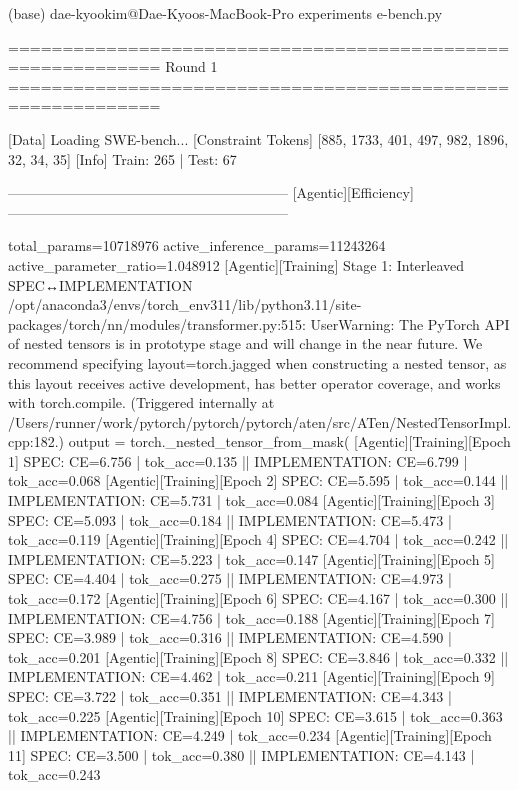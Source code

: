 (base) dae-kyookim@Dae-Kyoos-MacBook-Pro experiments %
e-bench.py

============================================================
Round 1
============================================================

[Data] Loading SWE-bench...
[Constraint Tokens] [885, 1733, 401, 497, 982, 1896, 32, 34, 35]
[Info] Train: 265 | Test: 67

------------------------------------------------------------
[Agentic][Efficiency]
------------------------------------------------------------

total_params=10718976
active_inference_params=11243264
active_parameter_ratio=1.048912
[Agentic][Training] Stage 1: Interleaved SPEC↔IMPLEMENTATION
/opt/anaconda3/envs/torch_env311/lib/python3.11/site-packages/torch/nn/modules/transformer.py:515: UserWarning: The PyTorch API of nested tensors is in prototype stage and will change in the near future. We recommend specifying layout=torch.jagged when constructing a nested tensor, as this layout receives active development, has better operator coverage, and works with torch.compile. (Triggered internally at /Users/runner/work/pytorch/pytorch/pytorch/aten/src/ATen/NestedTensorImpl.cpp:182.)
output = torch._nested_tensor_from_mask(
[Agentic][Training][Epoch 1] SPEC: CE=6.756 | tok_acc=0.135  ||  IMPLEMENTATION: CE=6.799 | tok_acc=0.068
[Agentic][Training][Epoch 2] SPEC: CE=5.595 | tok_acc=0.144  ||  IMPLEMENTATION: CE=5.731 | tok_acc=0.084
[Agentic][Training][Epoch 3] SPEC: CE=5.093 | tok_acc=0.184  ||  IMPLEMENTATION: CE=5.473 | tok_acc=0.119
[Agentic][Training][Epoch 4] SPEC: CE=4.704 | tok_acc=0.242  ||  IMPLEMENTATION: CE=5.223 | tok_acc=0.147
[Agentic][Training][Epoch 5] SPEC: CE=4.404 | tok_acc=0.275  ||  IMPLEMENTATION: CE=4.973 | tok_acc=0.172
[Agentic][Training][Epoch 6] SPEC: CE=4.167 | tok_acc=0.300  ||  IMPLEMENTATION: CE=4.756 | tok_acc=0.188
[Agentic][Training][Epoch 7] SPEC: CE=3.989 | tok_acc=0.316  ||  IMPLEMENTATION: CE=4.590 | tok_acc=0.201
[Agentic][Training][Epoch 8] SPEC: CE=3.846 | tok_acc=0.332  ||  IMPLEMENTATION: CE=4.462 | tok_acc=0.211
[Agentic][Training][Epoch 9] SPEC: CE=3.722 | tok_acc=0.351  ||  IMPLEMENTATION: CE=4.343 | tok_acc=0.225
[Agentic][Training][Epoch 10] SPEC: CE=3.615 | tok_acc=0.363  ||  IMPLEMENTATION: CE=4.249 | tok_acc=0.234
[Agentic][Training][Epoch 11] SPEC: CE=3.500 | tok_acc=0.380  ||  IMPLEMENTATION: CE=4.143 | tok_acc=0.243
